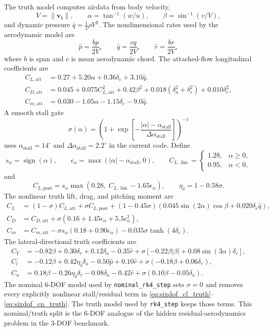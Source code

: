 \documentclass[11pt]{article}
\begin{document}
The truth model computes airdata from body velocity,
\[
V=\|\mathbf{v}_b\|,\qquad \alpha=\tan^{-1}(w/u),\qquad \beta=\sin^{-1}(v/V),
\]
and dynamic pressure $\bar{q}=\frac{1}{2}\rho V^2$. The nondimensional rates used by the aerodynamic model are
\[
\hat{p}=\frac{bp}{2V},\qquad
\hat{q}=\frac{cq}{2V},\qquad
\hat{r}=\frac{br}{2V},
\]
where $b$ is span and $c$ is mean aerodynamic chord. The attached-flow longitudinal coefficients are
\begin{align}
C_{L,\mathrm{att}} &= 0.27 + 5.20\alpha + 0.36\delta_e + 3.10\hat{q}, \label{eq:sixdof_cl_att}\\
C_{D,\mathrm{att}} &= 0.045 + 0.075C_{L,\mathrm{att}}^2 + 0.42\beta^2
    +0.018(\delta_a^2+\delta_r^2)+0.010\delta_e^2, \label{eq:sixdof_cd_att}\\
C_{m,\mathrm{att}} &= 0.030 - 1.05\alpha - 1.15\delta_e - 9.0\hat{q}. \label{eq:sixdof_cm_att}
\end{align}
A smooth stall gate
\[
\sigma(\alpha)=\left(1+\exp\left[-\frac{|\alpha|-\alpha_{\mathrm{stall}}}{\Delta\alpha_{\mathrm{stall}}}\right]\right)^{-1}
\]
uses $\alpha_{\mathrm{stall}}=14^\circ$ and $\Delta\alpha_{\mathrm{stall}}=2.2^\circ$ in the current code. Define
\[
s_\alpha=\operatorname{sign}(\alpha),\qquad
\epsilon_\alpha=\max(|\alpha|-\alpha_{\mathrm{stall}},0),\qquad
C_{L,\lim}=\begin{cases}1.28,&\alpha\ge 0,\\0.95,&\alpha<0,\end{cases}
\]
and
\[
C_{L,\mathrm{post}}=s_\alpha\max(0.28,\;C_{L,\lim}-1.65\epsilon_\alpha),\qquad
\eta_\delta=1-0.58\sigma.
\]
The nonlinear truth lift, drag, and pitching moment are
\begin{align}
C_L &= (1-\sigma)C_{L,\mathrm{att}}+\sigma C_{L,\mathrm{post}}
 +(1-0.45\sigma)\left(0.045\sin(2\alpha)\cos\beta+0.020\delta_e\hat{q}\right), \label{eq:sixdof_cl_truth}\\
C_D &= C_{D,\mathrm{att}}+\sigma\left(0.16+1.45\epsilon_\alpha+5.5\epsilon_\alpha^2\right), \label{eq:sixdof_cd_truth}\\
C_m &= C_{m,\mathrm{att}}
 -\sigma s_\alpha\left(0.18+0.90\epsilon_\alpha\right)
 -0.035\sigma\tanh(4\delta_e). \label{eq:sixdof_cm_truth}
\end{align}
The lateral-directional truth coefficients are
\begin{align}
C_Y &= -0.82\beta + 0.30\delta_r + 0.12\delta_a - 0.35\hat{r}
 +\sigma\left[-0.22\beta|\beta|+0.08\sin(3\alpha)\delta_r\right], \label{eq:sixdof_cy_truth}\\
C_l &= -0.12\beta + 0.42\eta_\delta\delta_a - 0.50\hat{p} + 0.10\hat{r}
 +\sigma(-0.18\beta+0.06\delta_r), \label{eq:sixdof_clroll_truth}\\
C_n &= 0.18\beta - 0.26\eta_\delta\delta_r - 0.08\delta_a - 0.42\hat{r}
 +\sigma(0.10\beta-0.05\delta_a). \label{eq:sixdof_cn_truth}
\end{align}
The nominal 6-DOF model used by \texttt{nominal\_rk4\_step} sets $\sigma=0$ and removes every explicitly nonlinear stall/residual term in \eqref{eq:sixdof_cl_truth}--\eqref{eq:sixdof_cn_truth}. The truth model used by \texttt{rk4\_step} keeps those terms. This nominal/truth split is the 6-DOF analogue of the hidden residual-aerodynamics problem in the 3-DOF benchmark.
\end{document}
